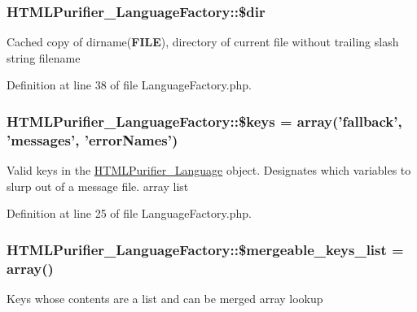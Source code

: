\hypertarget{classHTMLPurifier__LanguageFactory_a741f65f44cddbeb9a1ef54fedf8e2a89}{
\subsubsection[{\$dir}]{\setlength{\rightskip}{0pt plus 5cm}H\+T\+M\+L\+Purifier\+\_\+\+Language\+Factory\+::\$dir\hspace{0.3cm}{\ttfamily [protected]}}}\label{classHTMLPurifier__LanguageFactory_a741f65f44cddbeb9a1ef54fedf8e2a89}
Cached copy of dirname({\bfseries F\+I\+L\+E}), directory of current file without trailing slash  string filename 

Definition at line 38 of file Language\+Factory.\+php.

\hypertarget{classHTMLPurifier__LanguageFactory_ad42771f148ac00e139798d3eac59d592}{
\subsubsection[{\$keys}]{\setlength{\rightskip}{0pt plus 5cm}H\+T\+M\+L\+Purifier\+\_\+\+Language\+Factory\+::\$keys = array('fallback', 'messages', 'error\+Names')}}\label{classHTMLPurifier__LanguageFactory_ad42771f148ac00e139798d3eac59d592}
Valid keys in the \hyperlink{classHTMLPurifier__Language}{H\+T\+M\+L\+Purifier\+\_\+\+Language} object. Designates which variables to slurp out of a message file.  array list 

Definition at line 25 of file Language\+Factory.\+php.

\hypertarget{classHTMLPurifier__LanguageFactory_a9901a43e75cef050c89b117a10800843}{
\subsubsection[{\$mergeable\+\_\+keys\+\_\+list}]{\setlength{\rightskip}{0pt plus 5cm}H\+T\+M\+L\+Purifier\+\_\+\+Language\+Factory\+::\$mergeable\+\_\+keys\+\_\+list = array()\hspace{0.3cm}{\ttfamily [protected]}}}\label{classHTMLPurifier__LanguageFactory_a9901a43e75cef050c89b117a10800843}
Keys whose contents are a list and can be merged  array lookup 

